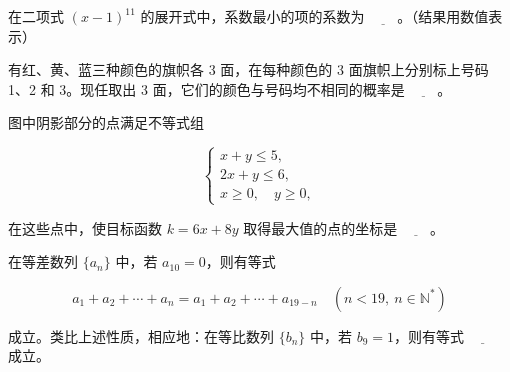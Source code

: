 \begin{question}
在二项式 $(x-1)^{11}$ 的展开式中，系数最小的项的系数为 $\underline{\qquad}$。（结果用数值表示）

\end{question}
\begin{question}
有红、黄、蓝三种颜色的旗帜各 3 面，在每种颜色的 3 面旗帜上分别标上号码 1、2 和 3。现任取出 3 面，它们的颜色与号码均不相同的概率是 $\underline{\qquad}$。

\Needspace{0.4\textheight}
\end{question}
\begin{question}
图中阴影部分的点满足不等式组

\nopagebreak[4]
\[
\begin{cases}
x+y\leq 5,\\
2x+y\leq 6,\\
x\geq 0,\quad y\geq 0,
\end{cases}
\]

在这些点中，使目标函数 $k=6x+8y$ 取得最大值的点的坐标是 $\underline{\qquad}$。
\nopagebreak[4]
\begin{center}\end{center}
\nopagebreak[4]
\end{question}
\begin{question}
在等差数列 $\{a_n\}$ 中，若 $a_{10}=0$，则有等式

\nopagebreak[4]
\[
a_1+a_2+\cdots+a_n=a_1+a_2+\cdots+a_{19-n}\quad(n<19,\ n\in\mathbb{N}^{*})
\]

成立。类比上述性质，相应地：在等比数列 $\{b_n\}$ 中，若 $b_9=1$，则有等式 $\underline{\qquad}$ 成立。

\end{question}


